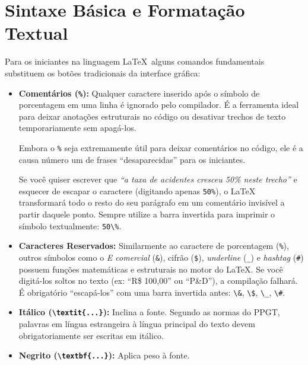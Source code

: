 \documentclass[a4paper,12pt]{article}
\begin{document}
\section{Sintaxe Básica e Formatação Textual}

Para os iniciantes na linguagem \LaTeX \, alguns comandos fundamentais substituem os botões tradicionais da interface gráfica:

\begin{itemize}
    \item \textbf{Comentários (\texttt{\%}):} Qualquer caractere inserido após o símbolo de porcentagem em uma linha é ignorado pelo compilador. É a ferramenta ideal para deixar anotações estruturais no código ou desativar trechos de texto temporariamente sem apagá-los.
    
    \begin{atencao}
    Embora o \texttt{\%} seja extremamente útil para deixar comentários no código, ele é a causa número um de frases ``desaparecidas'' para os iniciantes. 

    Se você quiser escrever que \textit{``a taxa de acidentes cresceu 50\% neste trecho''} e esquecer de escapar o caractere (digitando apenas \texttt{50\%}), o LaTeX transformará todo o resto do seu parágrafo em um comentário invisível a partir daquele ponto. Sempre utilize a barra invertida para imprimir o símbolo textualmente: \texttt{50\textbackslash\%}.
    \end{atencao}
    
    \item \textbf{Caracteres Reservados:} Similarmente ao caractere de porcentagem (\texttt{\%}), outros símbolos como o \textit{E comercial} (\texttt{\&}), cifrão (\texttt{\$}), \textit{underline} (\texttt{\_}) e \textit{hashtag} (\texttt{\#}) possuem funções matemáticas e estruturais no motor do \LaTeX. Se você digitá-los soltos no texto (ex: ``R\$ 100,00'' ou ``P\&D''), a compilação falhará. É obrigatório ``escapá-los'' com uma barra invertida antes: \texttt{\textbackslash\&}, \texttt{\textbackslash\$}, \texttt{\textbackslash\_}, \texttt{\textbackslash\#}.

    \item \textbf{Itálico (\texttt{\textbackslash textit\{...\}}):} Inclina a fonte. Segundo as normas do PPGT, palavras em língua estrangeira à língua principal do texto devem obrigatoriamente ser escritas em itálico.
    \item \textbf{Negrito (\texttt{\textbackslash textbf\{...\}}):} Aplica peso à fonte. 
    

\end{itemize}
\end{document}
